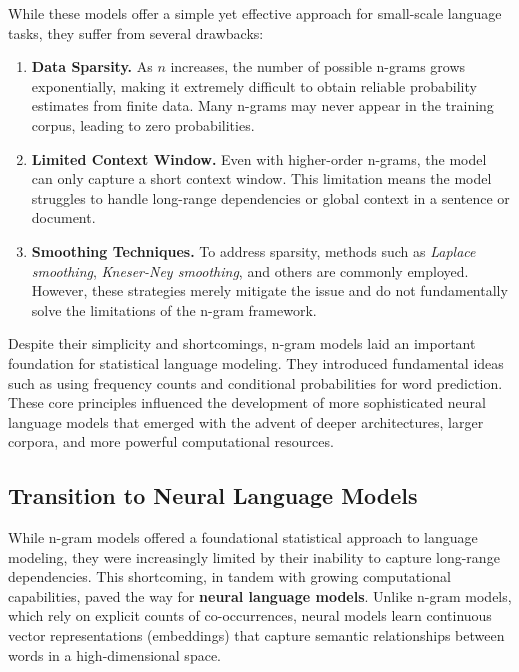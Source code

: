 \noindent
While these models offer a simple yet effective approach for small-scale language tasks, they suffer from several drawbacks:
\begin{enumerate}
    \item \textbf{Data Sparsity.} As $n$ increases, the number of possible n-grams grows exponentially, making it extremely difficult to obtain reliable probability estimates from finite data. Many n-grams may never appear in the training corpus, leading to zero probabilities.
    \item \textbf{Limited Context Window.} Even with higher-order n-grams, the model can only capture a short context window. This limitation means the model struggles to handle long-range dependencies or global context in a sentence or document.
    \item \textbf{Smoothing Techniques.} To address sparsity, methods such as \emph{Laplace smoothing}, \emph{Kneser-Ney smoothing}, and others are commonly employed. However, these strategies merely mitigate the issue and do not fundamentally solve the limitations of the n-gram framework.
\end{enumerate}

\noindent
Despite their simplicity and shortcomings, n-gram models laid an important foundation for statistical language modeling. They introduced fundamental ideas such as using frequency counts and conditional probabilities for word prediction. These core principles influenced the development of more sophisticated neural language models that emerged with the advent of deeper architectures, larger corpora, and more powerful computational resources.

\subsection{Transition to Neural Language Models}
\label{sec:transition_nn_models}

\noindent
While n-gram models offered a foundational statistical approach to language modeling, they were increasingly limited by their inability to capture long-range dependencies. This shortcoming, in tandem with growing computational capabilities, paved the way for \textbf{neural language models}. Unlike n-gram models, which rely on explicit counts of co-occurrences, neural models learn continuous vector representations (embeddings) that capture semantic relationships between words in a high-dimensional space.

